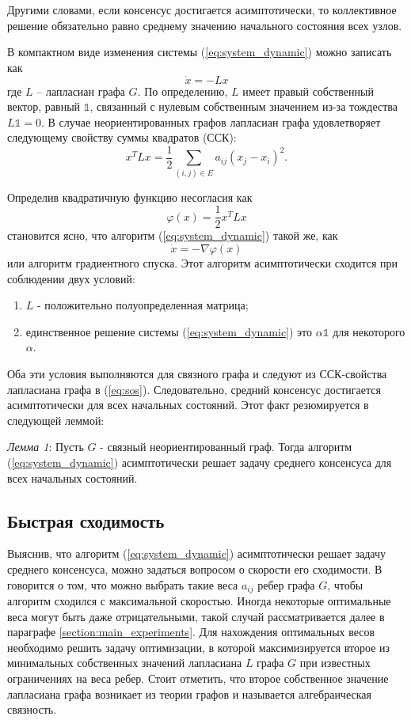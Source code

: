 \documentclass[a4paper,article,14pt]{extarticle}
\begin{document}
Другими словами, если консенсус достигается асимптотически, то коллективное решение обязательно равно среднему значению начального состояния всех узлов.

В компактном виде изменения системы (\ref{eq:system_dynamic}) можно записать как
\begin{equation}
\dot x = -Lx
\end{equation}
где $L$ -- лапласиан графа $G$. По определению, $L$ имеет правый собственный вектор, равный $\mathds{1}$, связанный с нулевым собственным значением из-за тождества $L\mathds{1} = 0$. В случае неориентированных графов лапласиан графа удовлетворяет следующему свойству суммы квадратов (ССК):
\begin{equation} \label{eq:sos}
x^TLx = \frac{1}{2}\sum_{(i, j) \in E} a_{ij}(x_j-x_i)^2.
\end{equation}

Определив квадратичную функцию несогласия как
\begin{equation}
\varphi(x) = \frac{1}{2}x^TLx
\end{equation}
становится ясно, что алгоритм (\ref{eq:system_dynamic}) такой же, как
\begin{equation}
\dot x = -\nabla \varphi(x)
\end{equation}
или алгоритм градиентного спуска. Этот алгоритм асимптотически сходится при соблюдении двух условий:
\begin{enumerate}
    \item $L$ - положительно полуопределенная матрица;
    \item единственное решение системы (\ref{eq:system_dynamic}) это $\alpha \mathds{1}$ для некоторого $\alpha$.
\end{enumerate}
Оба эти условия выполняются для связного графа и следуют из ССК-свойства лапласиана графа в (\ref{eq:sos}). Следовательно, средний консенсус достигается асимптотически для всех начальных состояний. Этот факт резюмируется в \cite{consensus_basics} следующей леммой:

\textit{Лемма 1}: Пусть $G$ - связный неориентированный граф. Тогда алгоритм (\ref{eq:system_dynamic}) асимптотически решает задачу среднего консенсуса для всех начальных состояний.

\subsection{Быстрая сходимость}
Выяснив, что алгоритм (\ref{eq:system_dynamic}) асимптотически решает задачу среднего консенсуса, можно задаться вопросом о скорости его сходимости. В \cite{fast_averaging} говорится о том, что можно выбрать такие веса $a_{ij}$ ребер графа $G$, чтобы алгоритм сходился с максимальной скоростью. Иногда некоторые оптимальные веса могут быть даже отрицательными, такой случай рассматривается далее в параграфе \ref{section:main_experiments}. Для нахождения оптимальных весов необходимо решить задачу оптимизации, в которой максимизируется второе из минимальных собственных значений лапласиана $L$ графа $G$ при известных ограничениях на веса ребер. Стоит отметить, что второе собственное значение лапласиана графа возникает из теории графов и называется алгебраическая связность.
\end{document}
